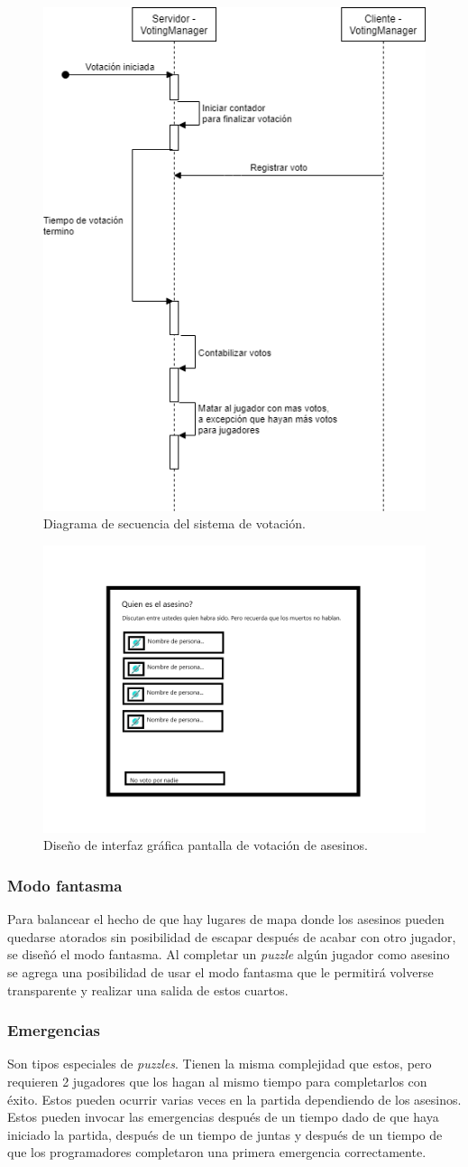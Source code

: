 \begin{figure}[H]
    \centering
    \includegraphics[width=0.5\linewidth]{images/diagrama_secuencia_votos.png}
    \caption{Diagrama de secuencia del sistema de votación.}
    \label{fig:diagrama_sec_votacion}
\end{figure}
\begin{figure}[H]
    \centering
    \includegraphics[width=0.5\linewidth]{images/votacion.png}
    \caption{Diseño de interfaz gráfica pantalla de votación de asesinos.}
    \label{fig:diagrama_ui_votacion}
\end{figure}

\subsubsection{Modo fantasma}
Para balancear el hecho de que hay lugares de mapa donde los asesinos pueden quedarse atorados sin posibilidad de escapar después de acabar con otro jugador, se diseñó el modo fantasma. Al completar un \textit{puzzle} algún jugador como asesino se agrega una posibilidad de usar el modo fantasma que le permitirá volverse transparente y realizar una salida de estos cuartos.

\subsubsection{Emergencias}
Son tipos especiales de \textit{puzzles}. Tienen la misma complejidad que estos, pero requieren 2 jugadores que los hagan al mismo tiempo para completarlos con éxito. Estos pueden ocurrir varias veces en la partida dependiendo de los asesinos. Estos pueden invocar las emergencias después de un tiempo dado de que haya iniciado la partida, después de un tiempo de juntas y después de un tiempo de que los programadores completaron una primera emergencia correctamente.

